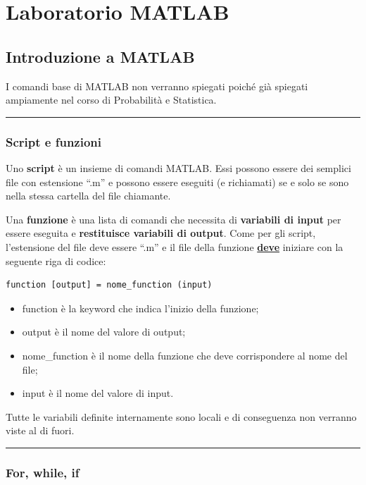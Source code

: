 \documentclass[a4paper]{article}
\newcommand{\dquotes}[1]{``#1''}
\newcommand{\longline}{\noindent\rule{\textwidth}{0.4pt}}
\begin{document}
	\section{Laboratorio MATLAB}
	
	\subsection{Introduzione a MATLAB}
	
	I comandi base di MATLAB non verranno spiegati poiché già spiegati ampiamente nel corso di Probabilità e Statistica.\newline
	
	\longline
	
	\subsubsection{Script e funzioni}
	
	Uno \textcolor{Red3}{\textbf{script}} è un insieme di comandi MATLAB. Essi possono essere dei semplici file con estensione \dquotes{.m} e possono essere eseguiti (e richiamati) se e solo se sono nella stessa cartella del file chiamante.\newline
	
	\noindent
	Una \textcolor{Red3}{\textbf{funzione}} è una lista di comandi che necessita di \textbf{variabili di input} per essere eseguita e \textbf{restituisce variabili di output}. Come per gli script, l'estensione del file deve essere \dquotes{.m} e il file della funzione \textbf{\underline{deve}} iniziare con la seguente riga di codice:
	\begin{lstlisting}
function [output] = nome_function (input)\end{lstlisting}
	\begin{itemize}
		\item \textsf{function} è la keyword che indica l'inizio della funzione;
		\item \textsf{output} è il nome del valore di output;
		\item \textsf{nome\_function} è il nome della funzione che deve corrispondere al nome del file;
		\item \textsf{input} è il nome del valore di input.
	\end{itemize}
	Tutte le variabili definite internamente sono locali e di conseguenza non verranno viste al di fuori.
	
	\longline
	
	\subsubsection{\textsf{For}, \textsf{while}, \textsf{if}}
	
\end{document}
